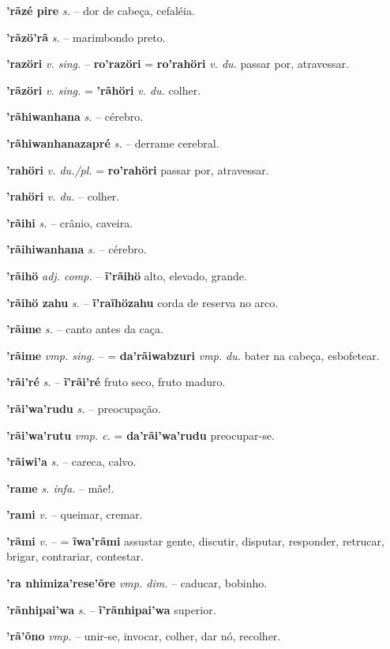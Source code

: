 \textbf{'rãzé pire} \textit{s.} -- dor de cabeça, cefaléia.

\textbf{'rãzö'rã} \textit{s.} -- marimbondo preto.

\textbf{'razöri} \textit{v. sing.} -- \textbf{ro'razöri} = \textbf{ro'rahöri} \textit{v. du.} passar por, atravessar.

\textbf{'rãzöri} \textit{v. sing.} = \textbf{'rãhöri} \textit{v. du.} colher.

\textbf{'rãhiwanhana} \textit{s.} -- cérebro.

\textbf{'rãhiwanhanazapré} \textit{s.} -- derrame cerebral.

\textbf{'rahöri} \textit{v. du./pl.} = \textbf{ro'rahöri} passar por, atravessar.

\textbf{'rahöri} \textit{v. du.} -- colher.

\textbf{'rãihi} \textit{s.} -- crânio, caveira.

\textbf{'rãihiwanhana} \textit{s.} -- cérebro.

\textbf{'rãihö} \textit{adj. comp.} -- \textbf{ĩ'rãihö} alto, elevado, grande.

\textbf{'rãihö zahu} \textit{s.} -- \textbf{ĩ'raĩhözahu} corda de reserva no arco.

\textbf{'rãime} \textit{s.} -- canto antes da caça.

\textbf{'rãime} \textit{vmp. sing.} -- = \textbf{da'rãiwabzuri} \textit{vmp. du.} bater na cabeça, esbofetear.

\textbf{'rãi'ré} \textit{s.} -- \textbf{ĩ'rãi'ré} fruto seco, fruto maduro.

\textbf{'rãi'wa'rudu} \textit{s.} -- preocupação.

\textbf{'rãi'wa'rutu} \textit{vmp. c.} = \textbf{da'rãi'wa'rudu} preocupar-se.

\textbf{'rãiwi'a} \textit{s.} -- careca, calvo.

\textbf{'rame} \textit{s. infa.} -- mãe!.

\textbf{'rami} \textit{v.} -- queimar, cremar.

\textbf{'rãmi} \textit{v.} -- = \textbf{ĩwa'rãmi} assustar gente, discutir, disputar, responder, retrucar, brigar, contrariar, contestar.

\textbf{'ra nhimiza'rese'õre} \textit{vmp. dim.} -- caducar, bobinho.

\textbf{'rãnhipai'wa} \textit{s.} -- \textbf{ĩ'rãnhipai'wa} superior.

\textbf{'rã'õno} \textit{vmp.} -- unir-se, invocar, colher, dar nó, recolher.

